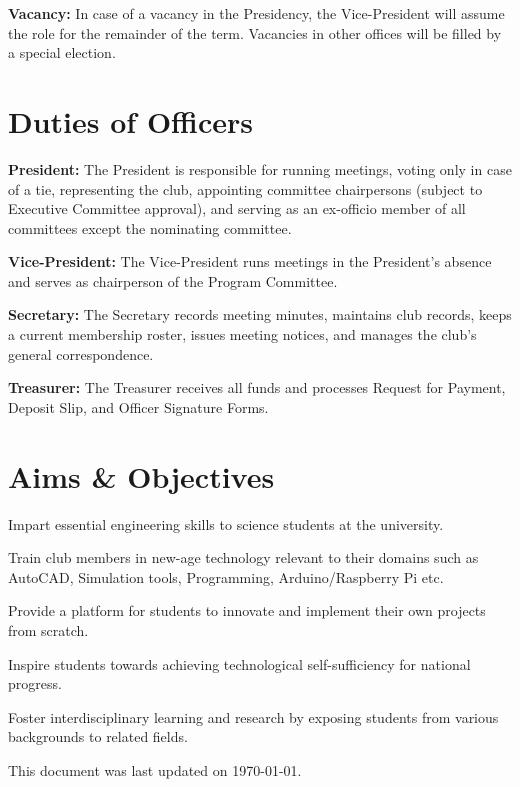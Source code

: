 \documentclass{article}
\begin{document}
\noindent \textbf{Vacancy:} In case of a vacancy in the Presidency, the Vice-President will assume the role for the remainder of the term. Vacancies in other offices will be filled by a special election.

\vspace{5mm}

\section{Duties of Officers}

\noindent \textbf{President:} The President is responsible for running meetings, voting only in case of a tie, representing the club, appointing committee chairpersons (subject to Executive Committee approval), and serving as an ex-officio member of all committees except the nominating committee.

\noindent \textbf{Vice-President:} The Vice-President runs meetings in the President's absence and serves as chairperson of the Program Committee.

\noindent \textbf{Secretary:} The Secretary records meeting minutes, maintains club records, keeps a current membership roster, issues meeting notices, and manages the club's general correspondence.

\noindent \textbf{Treasurer:} The Treasurer receives all funds and processes Request for Payment, Deposit Slip, and Officer Signature Forms.

\vspace{5mm}

\section{Aims \& Objectives}

\begin{aims}
\item Impart essential engineering skills to science students at the university.
\item Train club members in new-age technology relevant to their domains such as AutoCAD, Simulation tools, Programming, Arduino/Raspberry Pi etc.
\item Provide a platform for students to innovate and implement their own projects from scratch.
\item Inspire students towards achieving technological self-sufficiency for national progress.
\item Foster interdisciplinary learning and research by exposing students from various backgrounds to related fields.
\end{aims}

\vspace{5mm}

\noindent This document was last updated on \today.

\vspace{5mm}
\end{document}
